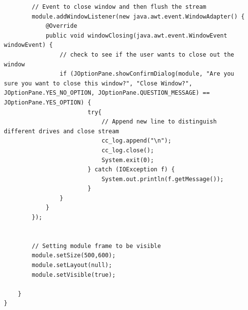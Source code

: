 \documentclass[preprint,11pt,3p]{article}
\begin{document}
\begin{lstlisting}
        // Event to close window and then flush the stream
        module.addWindowListener(new java.awt.event.WindowAdapter() {
            @Override
            public void windowClosing(java.awt.event.WindowEvent windowEvent) {
            	// check to see if the user wants to close out the window
                if (JOptionPane.showConfirmDialog(module, "Are you sure you want to close this window?", "Close Window?", JOptionPane.YES_NO_OPTION, JOptionPane.QUESTION_MESSAGE) == JOptionPane.YES_OPTION) {
                        try{
                        	// Append new line to distinguish different drives and close stream
                        	cc_log.append("\n");
                            cc_log.close();
                            System.exit(0);
                        } catch (IOException f) {
                            System.out.println(f.getMessage());
                        }
                }
            }
        });
        

        // Setting module frame to be visible
        module.setSize(500,600);
        module.setLayout(null);
        module.setVisible(true);
        
	}
}
\end{lstlisting}
\end{document}
